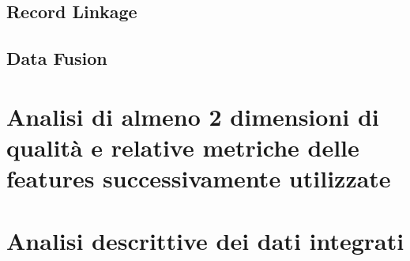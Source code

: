 \section{Record Linkage}
\label{sec:record-linkage}

\section{Data Fusion}

\chapter{Analisi di almeno 2 dimensioni di qualità e relative metriche delle features successivamente utilizzate}
\chapter{Analisi descrittive dei dati integrati}
